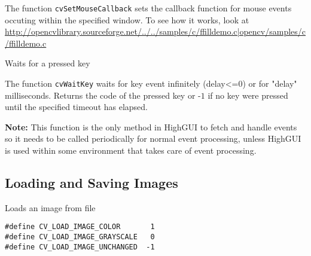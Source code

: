 The function \texttt{cvSetMouseCallback} sets the callback function for mouse events occuting within the specified window. To see how it works, look at \url{http://opencvlibrary.sourceforge.net/../../samples/c/ffilldemo.c|opencv/samples/c/ffilldemo.c} 


Waits for a pressed key


\begin{description}
\end{description}

The function \texttt{cvWaitKey} waits for key event infinitely (delay<=0) or for "delay" milliseconds. Returns the code of the pressed key or -$1$ if no key were pressed until the specified timeout has elapsed.

\textbf{Note:} This function is the only method in HighGUI to fetch and handle events so it needs to be called periodically for normal event processing, unless HighGUI is used within some environment that takes care of event processing.

\subsection{Loading and Saving Images}


Loads an image from file


\begin{lstlisting}
#define CV_LOAD_IMAGE_COLOR       1
#define CV_LOAD_IMAGE_GRAYSCALE   0
#define CV_LOAD_IMAGE_UNCHANGED  -1
\end{lstlisting}

\begin{description}
\end{description}

